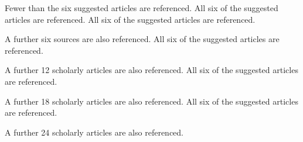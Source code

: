 \documentclass{../fal_assignment}
\begin{document}
%

\begin{markingrubric}
%
%
%
%
        \grade\fail	Fewer than the six suggested articles are referenced.
        \grade		All six of the suggested articles are referenced.
        \grade		All six of the suggested articles are referenced.
        \par		A further six sources are also referenced.
        \grade		All six of the suggested articles are referenced.
        \par		A further 12 scholarly articles are also referenced.
        \grade		All six of the suggested articles are referenced.
        \par		A further 18 scholarly articles are also referenced.
        \grade		All six of the suggested articles are referenced.
        \par		A further 24 scholarly articles are also referenced.
%

\end{markingrubric}
\end{document}

